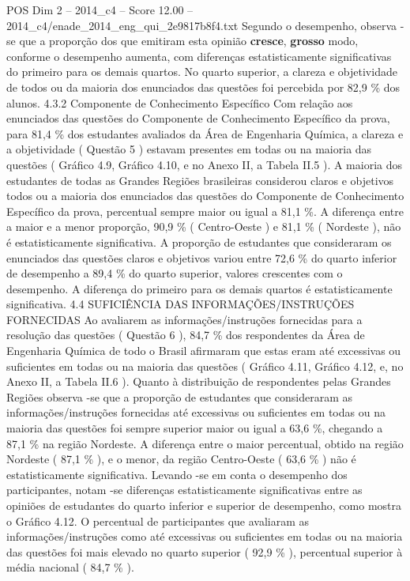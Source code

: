 \begin{textsample}{POS Dim 2 – 2014\_c4 – Score 12.00 – 2014\_c4/enade\_2014\_eng\_qui\_2e9817b8f4.txt}
Segundo o desempenho, observa -se que a proporção dos que emitiram esta opinião \textbf{cresce}, \textbf{grosso} modo, conforme o desempenho aumenta, com diferenças estatisticamente significativas do primeiro para os demais quartos.
No quarto superior, a clareza e objetividade de todos ou da maioria dos enunciados das questões foi percebida por 82,9 \% dos alunos. 4.3.2 Componente de Conhecimento Específico Com relação aos enunciados das questões do Componente de Conhecimento Específico da prova, para 81,4 \% dos estudantes avaliados da Área de Engenharia Química, a clareza e a objetividade ( Questão 5 ) estavam presentes em todas ou na maioria das questões ( Gráfico 4.9, Gráfico 4.10, e no Anexo II, a Tabela II.5 ).
A maioria dos estudantes de todas as Grandes Regiões brasileiras considerou claros e objetivos todos ou a maioria dos enunciados das questões do Componente de Conhecimento Específico da prova, percentual sempre maior ou igual a 81,1 \%.
A diferença entre a maior e a menor proporção, 90,9 \% ( Centro-Oeste ) e 81,1 \% ( Nordeste ), não é estatisticamente significativa.
A proporção de estudantes que consideraram os enunciados das questões claros e objetivos variou entre 72,6 \% do quarto inferior de desempenho a 89,4 \% do quarto superior, valores crescentes com o desempenho.
A diferença do primeiro para os demais quartos é estatisticamente significativa. 4.4 SUFICIÊNCIA DAS INFORMAÇÕES/INSTRUÇÕES FORNECIDAS Ao avaliarem as informações/instruções fornecidas para a resolução das questões ( Questão 6 ), 84,7 \% dos respondentes da Área de Engenharia Química de todo o Brasil afirmaram que estas eram até excessivas ou suficientes em todas ou na maioria das questões ( Gráfico 4.11, Gráfico 4.12, e, no Anexo II, a Tabela II.6 ).
Quanto à distribuição de respondentes pelas Grandes Regiões observa -se que a proporção de estudantes que consideraram as informações/instruções fornecidas até excessivas ou suficientes em todas ou na maioria das questões foi sempre superior maior ou igual a 63,6 \%, chegando a 87,1 \% na região Nordeste.
A diferença entre o maior percentual, obtido na região Nordeste ( 87,1 \% ), e o menor, da região Centro-Oeste ( 63,6 \% ) não é estatisticamente significativa.
Levando -se em conta o desempenho dos participantes, notam -se diferenças estatisticamente significativas entre as opiniões de estudantes do quarto inferior e superior de desempenho, como mostra o Gráfico 4.12.
O percentual de participantes que avaliaram as informações/instruções como até excessivas ou suficientes em todas ou na maioria das questões foi mais elevado no quarto superior ( 92,9 \% ), percentual superior à média nacional ( 84,7 \% ).

\end{textsample}
